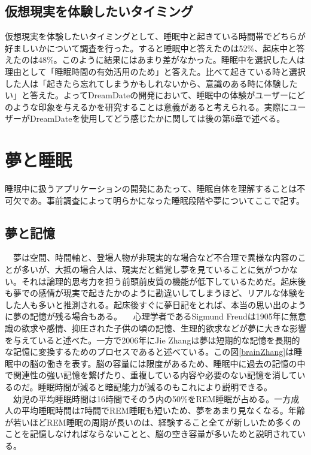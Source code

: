 \subsection{仮想現実を体験したいタイミング }
仮想現実を体験したいタイミングとして、睡眠中と起きている時間帯でどちらが好ましいかについて調査を行った。すると睡眠中と答えたのは52\%、起床中と答えたのは48\%。このように結果にはあまり差がなかった。睡眠中を選択した人は理由として「睡眠時間の有効活用のため」と答えた。比べて起きている時と選択した人は「起きたら忘れてしまうかもしれないから、意識のある時に体験したい」と答えた。よってDreamDateの開発において、睡眠中の体験がユーザーにどのような印象を与えるかを研究することは意義があると考えられる。実際にユーザーがDreamDateを使用してどう感じたかに関しては後の第6章で述べる。

\section{夢と睡眠}
睡眠中に扱うアプリケーションの開発にあたって、睡眠自体を理解することは不可欠であ。事前調査によって明らかになった睡眠段階や夢についてここで記す。

\subsection{夢と記憶}
　夢は空間、時間軸と、登場人物が非現実的な場合など不合理で異様な内容のことが多いが、大抵の場合人は、現実だと錯覚し夢を見ていることに気がつかない。それは論理的思考力を担う前頭前皮質の機能が低下しているためだ\cite{cortex}。起床後も夢での感情が現実で起きたかのように勘違いしてしまうほど、リアルな体験をした人も多いと推測される。起床後すぐに夢日記をとれば、本当の思い出のように夢の記憶が残る場合もある。
　心理学者であるSigmund Freudは1905年に無意識の欲求や感情、抑圧された子供の頃の記憶、生理的欲求などが夢に大きな影響を与えていると述べた\cite{freud}。一方で2006年にJie Zhangは夢は短期的な記憶を長期的な記憶に変換するためのプロセスであると述べている。この図\ref{brainZhang}は睡眠中の脳の働きを表す\cite{Zhang}。脳の容量には限度があるため、睡眠中に過去の記憶の中で関連性の強い記憶を繋げたり、重複している内容や必要のない記憶を消しているのだ\cite{Zhang}。睡眠時間が減ると暗記能力が減るのもこれにより説明できる。\\
　幼児の平均睡眠時間は16時間でそのう内の50\%をREM睡眠が占める。一方成人の平均睡眠時間は7時間でREM睡眠も短いため、夢をあまり見なくなる。年齢が若いほどREM睡眠の周期が長いのは、経験すること全てが新しいため多くのことを記憶しなければならないことと、脳の空き容量が多いためと説明されている。

